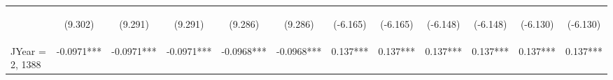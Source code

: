 \documentclass[]{article}
\begin{document}
\begin{center}
\begin{tabular}{lccccccccccc}
        \vspace{4pt}     & \begin{footnotesize}(9.302)\end{footnotesize}  & \begin{footnotesize}(9.291)\end{footnotesize}  & \begin{footnotesize}(9.291)\end{footnotesize}  & \begin{footnotesize}(9.286)\end{footnotesize}  & \begin{footnotesize}(9.286)\end{footnotesize}  & \begin{footnotesize}(-6.165)\end{footnotesize}  & \begin{footnotesize}(-6.165)\end{footnotesize}  & \begin{footnotesize}(-6.148)\end{footnotesize} & \begin{footnotesize}(-6.148)\end{footnotesize} & \begin{footnotesize}(-6.130)\end{footnotesize} & \begin{footnotesize}(-6.130)\end{footnotesize} \\
        JYear = 2, 1388  & -0.0971***                                     & -0.0971***                                     & -0.0971***                                     & -0.0968***                                     & -0.0968***                                     & 0.137***                                        & 0.137***                                        & 0.137***                                       & 0.137***                                       & 0.137***                                       & 0.137***                                       \\

\end{tabular}
\end{center}
\end{document}
